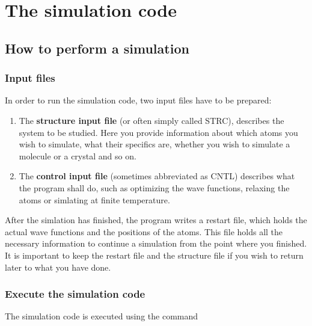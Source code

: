 \documentclass[final,12pt]{article}
\begin{document}
\section{The simulation code}

\subsection{How to perform a simulation}

\subsubsection{Input files}

In order to run the simulation code, two input files have to be
prepared:

\begin{enumerate}
\item The \textbf{structure input file} (or often simply called STRC),
  describes the system to be studied. Here you provide information
  about which atoms you wish to simulate, what their specifics are,
  whether you wish to simulate a molecule or a crystal and so on.
\item The \textbf{control input file} (sometimes abbreviated as CNTL)
  describes what the program shall do, such as optimizing the wave
  functions, relaxing the atoms or simlating at finite temperature.
\end{enumerate}

After the simlation has finished, the program writes a restart file, which
holds the actual wave functions and the positions of the atoms. This
file holds all the necessary information to continue a simulation from
the point where you finished.  It is important to keep the restart file
and the structure file if you wish to return later to what you have
done. 

\subsubsection{Execute the simulation code}

The simulation code is executed using the command

\bigskip{}\bigskip
\end{document}

